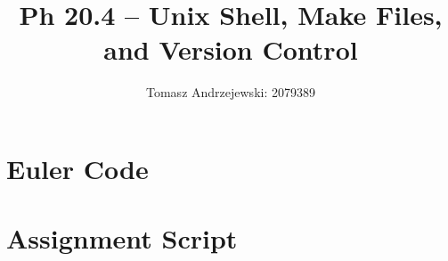 \documentclass{article}
\begin{document}
\title{Ph 20.4 – Unix Shell, Make Files, and Version Control}
\author{Tomasz Andrzejewski: 2079389}

\maketitle

\section*{Euler Code}

\clearpage

\section*{Assignment Script}

\end{document}
